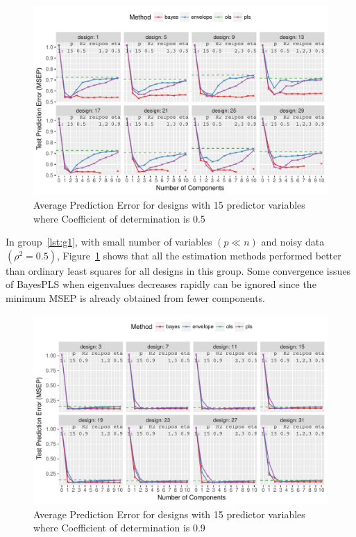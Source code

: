 \documentclass[a4paper, 11pt]{article}
\begin{document}
\begin{figure}[!ht]
  \centering
  \includegraphics[width = \textwidth]{pdf/prediction-error-15-1.pdf}
  \caption[Prediction Error]{Average Prediction Error for designs with 15 predictor
    variables where Coefficient of determination is 0.5}
  \label{fig:pred-error-15-1}
\end{figure}
In group~\ref{lst:g1}, with small number of variables $(p \ll n)$ and noisy data
$(\rho^2 = 0.5)$, Figure~\ref{fig:pred-error-15-1} shows that all the estimation
methods performed better than ordinary least squares for all designs in this
group. Some convergence issues of BayesPLS when eigenvalues decreases rapidly
can be ignored since the minimum MSEP is already obtained from fewer components.

\begin{figure}[!ht]
  \centering
  \includegraphics[width = \textwidth]{pdf/prediction-error-15-2.pdf}
  \caption[Prediction Error]{Average Prediction Error for designs with 15 predictor
    variables where Coefficient of determination is 0.9}
  \label{fig:pred-error-15-2}
\end{figure}
\end{document}
